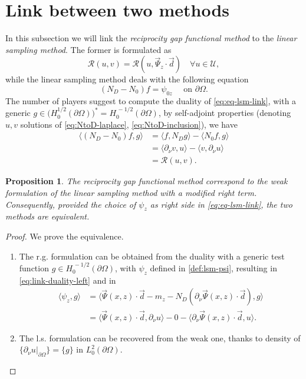\documentclass[10pt, a4paper, twoside, openright]{book}
\theoremstyle{definition}
\theoremstyle{plain}
\theoremstyle{plain}
\theoremstyle{plain}
\newtheorem{proposition}[subsection]{Proposition}
\theoremstyle{plain}
\theoremstyle{plain}
\theoremstyle{plain}
\theoremstyle{plain}
\theoremstyle{plain}
\begin{document}
\section{Link between two methods}
In this subsection we will link the \textit{reciprocity gap functional method} to the \emph{linear sampling method}.
The former is formulated as
\begin{equation}
 \mathcal{R}(u, v) = \mathcal{R}(u, \vec{\Psi}_z\cdot\vec{d})\quad \forall u \in \mathcal{U},
\end{equation}
while the linear sampling method deals with the following equation
\begin{equation}
\label{eq:eq-lsm-link}
 ({N_D} - {N_0})f = \psi_{0z} \quad \text{ on }\partial \Omega.
\end{equation}
The number of players suggest to compute the duality of \eqref{eq:eq-lsm-link}, with a generic 
${g \in \bigl(H^{1/2}_0(\partial \Omega)\bigr)^* = H^{\,-1/2}_0(\partial \Omega)}$, by self-adjoint properties (denoting $u,v$ solutions of \eqref{eq:NtoD-laplace}, \eqref{eq:NtoD-inclusion}), we have
\begin{align}
 \label{eq:link-duality-left}
 \langle({N_D} - {N_0})f,g\rangle & =  \langle f,{N_D} g\rangle - \langle {N_0} f,g\rangle \\
                                        & = \langle \partial_\nu v,u\rangle - \langle v,\partial_\nu u\rangle \\
                                        & = \mathcal{R}(u,v).
\end{align}
\begin{proposition}
 The \textit{reciprocity gap functional method} correspond to the weak formulation of the \textit{linear sampling method} with a modified right term. Consequently, provided the choice of $\psi_z$ as right side in \eqref{eq:eq-lsm-link}, the two methods are equivalent.
\end{proposition}
\begin{proof} We prove the equivalence.
\begin{enumerate}
 \item The r.g. formulation can be obtained from the duality with a generic test function $g\in H^{\, -1/2}_0(\partial \Omega)$, with $\psi_z$ defined in \ref{def:lsm-psi}, resulting in \eqref{eq:link-duality-left} and in
\begin{align}
 \langle \psi_z , g \rangle  & = \langle \vec{\Psi}(x,z)\cdot\vec{d} - m_z - {N_D}(\partial_\nu \vec{\Psi}(x,z) \cdot \vec{d}) , g \rangle \\
                             & = \langle \vec{\Psi}(x,z)\cdot\vec{d},\partial_\nu u\rangle - 0 - \langle\partial_\nu \vec{\Psi}(x,z) \cdot \vec{d},u\rangle.
\end{align}
 \item The l.s. formulation can be recovered from the weak one, thanks to density of $\{\partial_\nu u|_{\partial \Omega}\}=\{g\}$ in $L_0^2(\partial \Omega)$.
\end{enumerate}
\end{proof}
\end{document}
